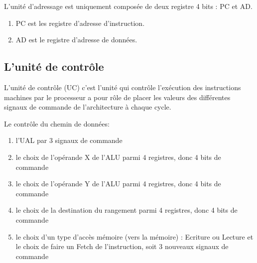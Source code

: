 L'unité d'adressage est uniquement composée de deux registre 4 bits : PC et AD.

\begin{enumerate}
\item PC est les registre d'adresse d'instruction.
\item AD est le registre d'adresse de données.
\end{enumerate}


\subsection{L'unité de contrôle}
\label{sec:unité contrôle}

L'unité de contrôle (UC) c'est l’unité qui contrôle l’exécution des instructions machines par le processeur a pour rôle de placer 
les valeurs des différentes signaux de commande de l’architecture à chaque cycle.

Le contrôle du chemin de données:
\begin{enumerate}
\item l’UAL par 3 signaux de commande 
\item le choix de l’opérande X de l’ALU parmi 4 registres, donc 4 bits de commande 
\item le choix de l’opérande Y de l’ALU parmi 4 registres, donc 4 bits de commande 
\item le choix de la destination du rangement parmi 4 registres, donc 4 bits de commande 
\item le choix d’un type d’accès mémoire (vers la mémoire) : Ecriture ou Lecture et le choix de faire un Fetch de l’instruction, soit 3 nouveaux signaux de commande
\end{enumerate}

